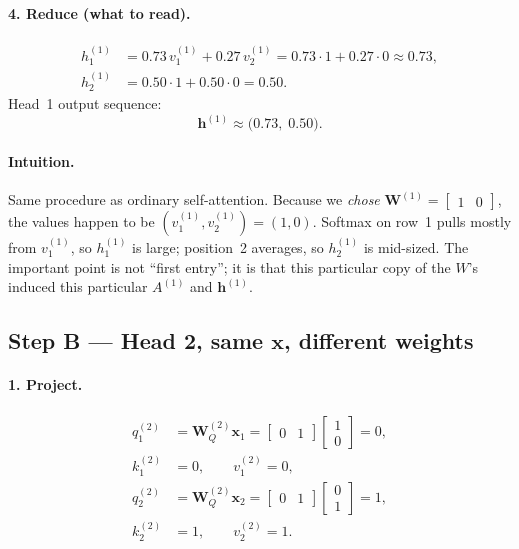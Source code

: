 \documentclass[11pt]{article}
\begin{document}
\paragraph{4. Reduce (what to read).}
\[
\begin{aligned}
  h_1^{(1)}
  &=
  0.73\,v_1^{(1)}+0.27\,v_2^{(1)}
  =
  0.73\cdot 1 + 0.27\cdot 0
  \approx 0.73, \\
  h_2^{(1)}
  &=
  0.50\cdot 1 + 0.50\cdot 0
  = 0.50.
\end{aligned}
\]
Head~1 output sequence:
\[
  \mathbf{h}^{(1)} \approx \bigl(0.73,\; 0.50\bigr).
\]

\paragraph{Intuition.}
Same procedure as ordinary self-attention. Because we \emph{chose}
\(\mathbf{W}^{(1)}=\begin{bmatrix}1&0\end{bmatrix}\), the values happen
to be \((v_1^{(1)},v_2^{(1)})=(1,0)\). Softmax on row~1 pulls mostly from
\(v_1^{(1)}\), so \(h_1^{(1)}\) is large; position~2 averages, so
\(h_2^{(1)}\) is mid-sized. The important point is not ``first entry'';
it is that this particular copy of the \(W\)'s induced this particular
\(A^{(1)}\) and \(\mathbf{h}^{(1)}\).

\subsection{Step B --- Head 2, same \(\mathbf{x}\), different weights}

\paragraph{1. Project.}
\begin{align*}
  q_1^{(2)} &= \mathbf{W}_Q^{(2)}\mathbf{x}_1
             = \begin{bmatrix}0&1\end{bmatrix}\begin{bmatrix}1\\0\end{bmatrix}
             = 0, \\
  k_1^{(2)} &= 0,\qquad v_1^{(2)}=0, \\[0.3em]
  q_2^{(2)} &= \mathbf{W}_Q^{(2)}\mathbf{x}_2
             = \begin{bmatrix}0&1\end{bmatrix}\begin{bmatrix}0\\1\end{bmatrix}
             = 1, \\
  k_2^{(2)} &= 1,\qquad v_2^{(2)}=1.
\end{align*}
\end{document}
